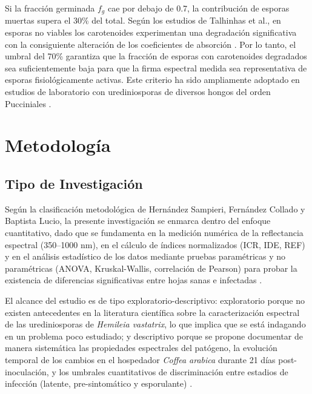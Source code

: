 \documentclass[12pt, a4paper]{article}
\begin{document}
	Si la fracción germinada $f_g$ cae por debajo de 0.7, la contribución de esporas muertas supera el 30\% del total. Según los estudios de Talhinhas et al., en esporas no viables los carotenoides experimentan una degradación significativa con la consiguiente alteración de los coeficientes de absorción \parencite{Talhinhas2017}. Por lo tanto, el umbral del 70\% garantiza que la fracción de esporas con carotenoides degradados sea suficientemente baja para que la firma espectral medida sea representativa de esporas fisiológicamente activas. Este criterio ha sido ampliamente adoptado en estudios de laboratorio con urediniosporas de diversos hongos del orden Pucciniales \parencite{Money2016, Talhinhas2017}.
	
	
	
	\section{Metodología}
	
	\subsection{Tipo de Investigación}
	
	Según la clasificación metodológica de Hernández Sampieri, Fernández Collado y Baptista Lucio, la presente investigación se enmarca dentro del enfoque cuantitativo, dado que se fundamenta en la medición numérica de la reflectancia espectral (350--1000 nm), en el cálculo de índices normalizados (ICR, IDE, REF) y en el análisis estadístico de los datos mediante pruebas paramétricas y no paramétricas (ANOVA, Kruskal-Wallis, correlación de Pearson) para probar la existencia de diferencias significativas entre hojas sanas e infectadas \parencite{sampieri2014}. 
	
	El alcance del estudio es de tipo exploratorio-descriptivo: exploratorio porque no existen antecedentes en la literatura científica sobre la caracterización espectral de las urediniosporas de \textit{Hemileia vastatrix}, lo que implica que se está indagando en un problema poco estudiado; y descriptivo porque se propone documentar de manera sistemática las propiedades espectrales del patógeno, la evolución temporal de los cambios en el hospedador \textit{Coffea arabica} durante 21 días post-inoculación, y los umbrales cuantitativos de discriminación entre estadios de infección (latente, pre-sintomático y esporulante) \parencite{sampieri2014}. 
	
\end{document}
